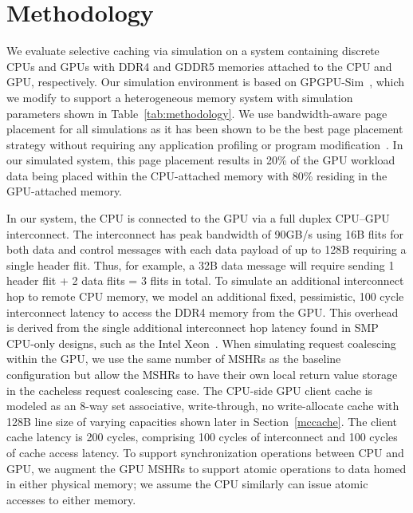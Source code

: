 \vspace{-.05in}
\section{Methodology}
\label{methodology}

We evaluate selective caching via simulation on a system containing discrete CPUs and GPUs with
DDR4 and GDDR5 memories attached to the CPU and GPU, respectively.  Our simulation environment is based on
GPGPU-Sim~\cite{gpgpusim_ispass09}, which we modify to support a heterogeneous
memory system with simulation parameters shown in Table~\ref{tab:methodology}.
We use bandwidth-aware page placement for all simulations as it has been
shown to be the best page placement strategy without requiring
any application profiling or program modification~\cite{Agarwal2015}. 
In our simulated system, this page placement results in 20\% of the
GPU workload data being placed within the CPU-attached memory with 80\% residing in the GPU-attached
memory.  

In our system, the CPU is connected to the GPU via a full duplex CPU--GPU
interconnect. The interconnect has peak bandwidth of 90GB/s using
16B flits for both data and control messages with each data payload of up to
128B requiring a single header flit.  Thus, for example, a 32B data
message will require sending 1 header flit + 2 data flits = 3 flits in total.
To simulate an additional interconnect hop to remote CPU memory, we model an
additional fixed, pessimistic, 100 cycle interconnect latency to access the DDR4 memory from
the GPU\@. This overhead is derived from the single additional interconnect hop
latency found in SMP CPU-only designs, such as the Intel Xeon~\cite{INTELXEONE5V3}.
When simulating request coalescing within the GPU, we use the same number of MSHRs as
the baseline configuration but allow the MSHRs to have their own local return value storage in
the cacheless request coalescing case. 
The CPU-side GPU client cache is modeled as an 8-way set 
associative, write-through, no write-allocate cache with 128B line size of varying capacities
shown later in Section~\ref{mccache}. The client cache latency is 200
cycles, comprising 100 cycles of interconnect and 100 cycles of cache access latency.
To support synchronization operations between CPU and GPU, we augment the GPU 
MSHRs to support atomic operations to data homed in either physical memory; we assume
the CPU similarly can issue atomic accesses to either memory.

